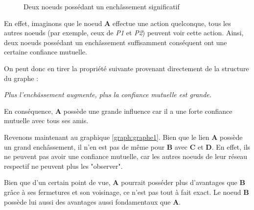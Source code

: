 \begin{figure}[h!]
\centering
{}
\caption{Deux noeuds possédant un enchâssement significatif}
\label{graph:graphe2}
\end{figure}

 En effet, imaginons que le noeud \textbf{A} effectue une action quelconque, tous les autres noeuds (par exemple, ceux de \textit{P1} et \textit{P2}) peuvent voir cette action.
Ainsi, deux noeuds possédant un enchâssement suffisamment conséquent ont une certaine confiance mutuelle.

On peut donc en tirer la propriété suivante provenant directement de la structure du graphe :

\vspace{1ex}
\textit{Plus l'enchâssement augmente, plus la confiance mutuelle est grande.}

\vspace{1ex}
En conséquence, \textbf{A} possède une grande influence car il a une forte confiance mutuelle avec tous ses amis.

Revenons maintenant au graphique \ref{graph:graphe1}. Bien que le lien \textbf{A} possède un grand enchâssement, il n'en est pas de même pour \textbf{B} avec \textbf{C} et \textbf{D}.
En effet, ils ne peuvent pas avoir une confiance mutuelle, car les autres noeuds de leur réseau respectif ne peuvent plus les "observer".

\vspace{1ex}
Bien que d'un certain point de vue, \textbf{A} pourrait posséder plus d'avantages que \textbf{B} grâce à ses fermetures et son voisinage, ce n'est pas tout à fait exact. Le noeud \textbf{B} possède lui aussi des avantages aussi fondamentaux que \textbf{A}.

